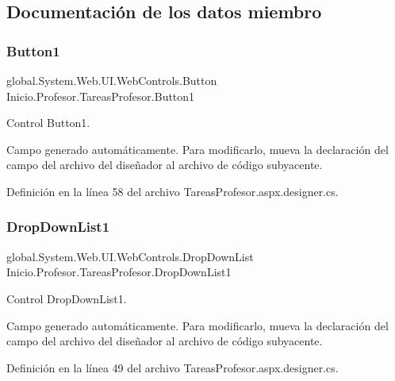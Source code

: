 \subsection{Documentación de los datos miembro}
\mbox{\label{classInicio_1_1Profesor_1_1TareasProfesor_adb0d86a1ae5a053280690046a8f02dd3}} 
\subsubsection{\texorpdfstring{Button1}{Button1}}
{\footnotesize\ttfamily global.\+System.\+Web.\+U\+I.\+Web\+Controls.\+Button Inicio.\+Profesor.\+Tareas\+Profesor.\+Button1\hspace{0.3cm}{\ttfamily [protected]}}



Control Button1. 

Campo generado automáticamente. Para modificarlo, mueva la declaración del campo del archivo del diseñador al archivo de código subyacente. 

Definición en la línea 58 del archivo Tareas\+Profesor.\+aspx.\+designer.\+cs.

\mbox{\label{classInicio_1_1Profesor_1_1TareasProfesor_a15e4992e4318dc812e57d2e7e1fc4d44}} 
\subsubsection{\texorpdfstring{DropDownList1}{DropDownList1}}
{\footnotesize\ttfamily global.\+System.\+Web.\+U\+I.\+Web\+Controls.\+Drop\+Down\+List Inicio.\+Profesor.\+Tareas\+Profesor.\+Drop\+Down\+List1\hspace{0.3cm}{\ttfamily [protected]}}



Control Drop\+Down\+List1. 

Campo generado automáticamente. Para modificarlo, mueva la declaración del campo del archivo del diseñador al archivo de código subyacente. 

Definición en la línea 49 del archivo Tareas\+Profesor.\+aspx.\+designer.\+cs.

